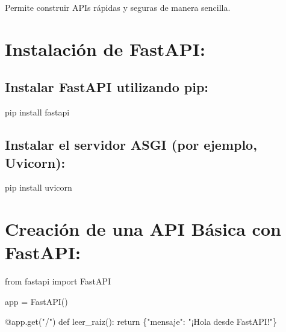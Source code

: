 \documentclass[
  a4paper,
  DIV=11,
  numbers=noendperiod,
  onepage,
  openany]{scrreprt}
\newenvironment{Shaded}{\begin{snugshade}}{\end{snugshade}}
\newcommand{\AttributeTok}[1]{\textcolor[rgb]{0.40,0.45,0.13}{#1}}
\newcommand{\ControlFlowTok}[1]{\textcolor[rgb]{0.00,0.23,0.31}{#1}}
\newcommand{\ExtensionTok}[1]{\textcolor[rgb]{0.00,0.23,0.31}{#1}}
\newcommand{\ImportTok}[1]{\textcolor[rgb]{0.00,0.46,0.62}{#1}}
\newcommand{\KeywordTok}[1]{\textcolor[rgb]{0.00,0.23,0.31}{#1}}
\newcommand{\NormalTok}[1]{\textcolor[rgb]{0.00,0.23,0.31}{#1}}
\newcommand{\OperatorTok}[1]{\textcolor[rgb]{0.37,0.37,0.37}{#1}}
\newcommand{\StringTok}[1]{\textcolor[rgb]{0.13,0.47,0.30}{#1}}
\begin{document}
Permite construir APIs rápidas y seguras de manera sencilla.

\hypertarget{instalaciuxf3n-de-fastapi}{%
\section{Instalación de FastAPI:}\label{instalaciuxf3n-de-fastapi}}

\hypertarget{instalar-fastapi-utilizando-pip}{%
\subsection{Instalar FastAPI utilizando
pip:}\label{instalar-fastapi-utilizando-pip}}

\begin{Shaded}
\begin{Highlighting}[]
\ExtensionTok{pip}\NormalTok{ install fastapi}
\end{Highlighting}
\end{Shaded}

\hypertarget{instalar-el-servidor-asgi-por-ejemplo-uvicorn}{%
\subsection{Instalar el servidor ASGI (por ejemplo,
Uvicorn):}\label{instalar-el-servidor-asgi-por-ejemplo-uvicorn}}

\begin{Shaded}
\begin{Highlighting}[]
\ExtensionTok{pip}\NormalTok{ install uvicorn}
\end{Highlighting}
\end{Shaded}

\hypertarget{creaciuxf3n-de-una-api-buxe1sica-con-fastapi}{%
\section{Creación de una API Básica con
FastAPI:}\label{creaciuxf3n-de-una-api-buxe1sica-con-fastapi}}

\begin{Shaded}
\begin{Highlighting}[]
\ImportTok{from}\NormalTok{ fastapi }\ImportTok{import}\NormalTok{ FastAPI}

\NormalTok{app }\OperatorTok{=}\NormalTok{ FastAPI()}

\AttributeTok{@app.get}\NormalTok{(}\StringTok{"/"}\NormalTok{)}
\KeywordTok{def}\NormalTok{ leer\_raiz():}
    \ControlFlowTok{return}\NormalTok{ \{}\StringTok{"mensaje"}\NormalTok{: }\StringTok{"¡Hola desde FastAPI!"}\NormalTok{\}}
\end{Highlighting}
\end{Shaded}
\end{document}
